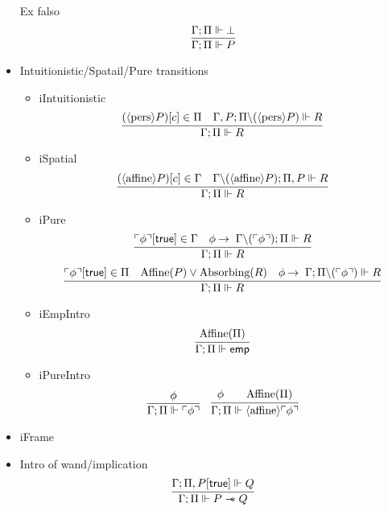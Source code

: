 \begin{itemize}
  Ex falso
  \[
  \infer{\entailsD P}
        {\entailsD \bot}
  \]
\item Intuitionistic/Spatail/Pure transitions
  \begin{itemize}
  \item iIntuitionistic
    \[
    \infer{\entailsD R}
          {(\pers P)[c] \in \SpatD &
           \entails {\IntuD, P} {\SpatD \backslash (\pers P)} {R}
         }
    \]
  \item iSpatial
    \[
    \infer{\entailsD R}
          {(\affine P)[c] \in \IntuD &
           \entails {\IntuD \backslash (\affine P)} {\SpatD, P} {R}
         }
    \]
  \item iPure
    \[
    \infer{\entailsD R}
          {\pure{\phi}[\true] \in \IntuD &
           \phi \imp \entails {\IntuD \backslash (\pure{\phi})} {\SpatD} {R}
         }
    \]
    \[
    \infer{\entailsD R}
          {\pure{\phi}[\true] \in \SpatD &
           \Affine{P} \vee \Absorbing{R} &
           \phi \imp \entails {\IntuD} {\SpatD \backslash (\pure{\phi})} {R}
         }
    \]
  \item iEmpIntro
    \[
    \infer{\entailsD \emp}
          {\Affine{\SpatD}}
    \]
  \item iPureIntro
    \begin{equation}
    \infer{\entailsD {\pure \phi}}
          {\phi}
    \quad
    \infer{\entailsD {\affine \pure \phi }}
          {\phi & &
           \Affine{\SpatD}
          }
    \end{equation}
  \end{itemize}
\item iFrame
\item Intro of wand/implication
  \[
  \infer{\entailsD P \wand Q}
        {\entails {\IntuD} {\SpatD , P[\true]} {Q}}
  \]


\end{itemize}
